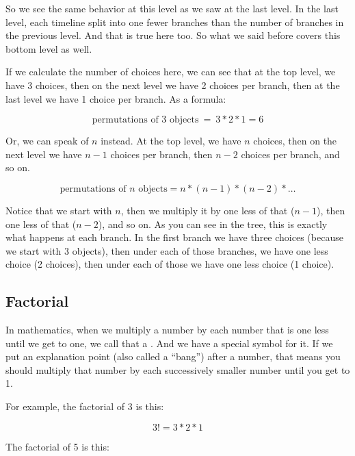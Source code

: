 \documentclass[../../../main.tex]{subfiles}
\begin{document}
So we see the same behavior at this level as we saw at the last level. In the last level, each timeline split into one fewer branches than the number of branches in the previous level. And that is true here too. So what we said before covers this bottom level as well.

If we calculate the number of choices here, we can see that at the top level, we have 3 choices, then on the next level we have 2 choices per branch, then at the last level we have 1 choice per branch. As a formula:

\begin{equation*}
  \text{permutations of 3 objects}~=~3 * 2 * 1 = 6
\end{equation*}

\noindent
Or, we can speak of $n$ instead. At the top level, we have $n$ choices, then on the next level we have $n - 1$ choices per branch, then $n - 2$ choices per branch, and so on.

\begin{equation*}
  \text{permutations of $n$ objects} = n * (n - 1) * (n - 2) * \ldots
\end{equation*}

\noindent
Notice that we start with $n$, then we multiply it by one less of that ($n - 1$), then one less of that ($n - 2$), and so on. As you can see in the tree, this is exactly what happens at each branch. In the first branch we have three choices (because we start with 3 objects), then under each of those branches, we have one less choice (2 choices), then under each of those we have one less choice (1 choice).


\subsection{Factorial}

In mathematics, when we multiply a number by each number that is one less until we get to one, we call that a . And we have a special symbol for it. If we put an explanation point (also called a ``bang'') after a number, that means you should multiply that number by each successively smaller number until you get to 1. 

For example, the factorial of 3 is this:

\begin{equation*}
  3! = 3 * 2 * 1
\end{equation*}

\noindent
The factorial of 5 is this:
\end{document}
